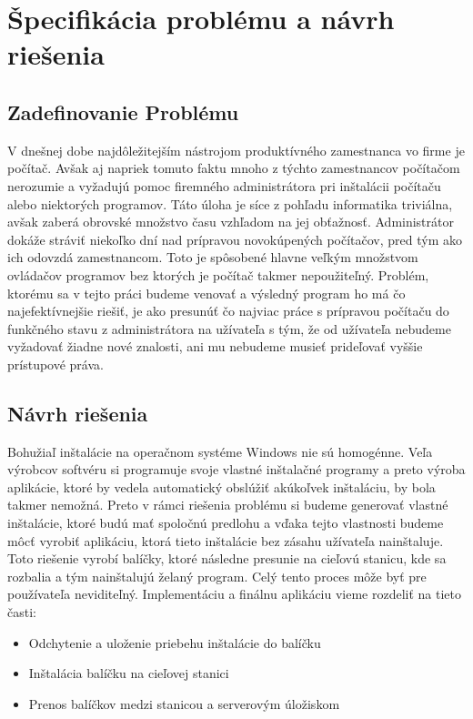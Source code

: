 \chapter{Špecifikácia problému a návrh riešenia}

\section{Zadefinovanie Problému}

V dnešnej dobe najdôležitejším nástrojom produktívného zamestnanca vo firme je počítač. Avšak aj napriek tomuto faktu mnoho z týchto zamestnancov počítačom nerozumie a vyžadujú pomoc firemného administrátora pri inštalácii počítaču alebo niektorých programov. Táto úloha je síce z pohľadu informatika triviálna, avšak zaberá obrovské množstvo času vzhľadom na jej obťažnosť. Administrátor dokáže stráviť niekoľko dní nad prípravou novokúpených  počítačov, pred tým ako ich odovzdá zamestnancom. Toto je spôsobené hlavne veľkým množstvom ovládačov programov bez ktorých je počítač takmer nepoužiteľný. 
Problém, ktorému sa v tejto práci budeme venovať a výsledný program ho má čo najefektívnejšie riešiť, je ako presunúť čo najviac práce s prípravou počítaču do funkčného stavu z administrátora na užívateľa s tým, že od užívateľa nebudeme vyžadovať žiadne nové znalosti, ani mu nebudeme musieť prideľovať vyššie prístupové práva.

\section{Návrh riešenia}

Bohužiaľ inštalácie na operačnom systéme Windows nie sú homogénne. Veľa výrobcov softvéru si programuje svoje vlastné inštalačné programy a preto výroba aplikácie, ktoré by vedela automatický obslúžiť akúkoľvek inštaláciu, by bola takmer nemožná. Preto v rámci riešenia problému si budeme generovať vlastné inštalácie, ktoré budú mať spoločnú predlohu a vďaka tejto vlastnosti budeme môcť vyrobiť aplikáciu, ktorá tieto inštalácie bez zásahu užívateľa nainštaluje.  Toto riešenie vyrobí balíčky, ktoré následne presunie na cieľovú stanicu, kde sa rozbalia a tým nainštalujú želaný program. Celý tento proces môže byť pre používateľa neviditeľný.  Implementáciu a finálnu aplikáciu vieme rozdeliť na tieto časti:

\begin{itemize}
\item Odchytenie a uloženie priebehu inštalácie do balíčku
\item Inštalácia balíčku na cieľovej stanici
\item Prenos balíčkov medzi stanicou a serverovým úložiskom
\end{itemize}

